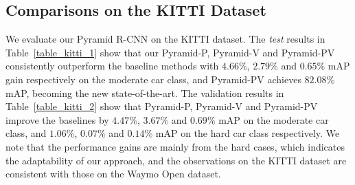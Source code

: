 \documentclass[10pt,twocolumn,letterpaper]{article}
\begin{document}
\subsection{Comparisons on the KITTI Dataset} \label{3D Detection on the KITTI Dataset}
We evaluate our Pyramid R-CNN on the KITTI dataset. The \textit{test} results in Table~\ref{table_kitti_1} show that our Pyramid-P, Pyramid-V and Pyramid-PV consistently outperform the baseline methods with $4.66\%$, $2.79\%$ and $0.65\%$ mAP gain respectively on the moderate car class, and Pyramid-PV achieves $82.08\%$ mAP, becoming the new state-of-the-art. The validation results in Table~\ref{table_kitti_2} show that Pyramid-P, Pyramid-V and Pyramid-PV improve the baselines by $4.47\%$, $3.67\%$ and $0.69\%$ mAP on the moderate car class, and $1.06\%$, $0.07\%$ and $0.14\%$ mAP on the hard car class respectively. We note that the performance gains are mainly from the hard cases, which indicates the adaptability of our approach, and the observations on the KITTI dataset are consistent with those on the Waymo Open dataset. 
\end{document}
